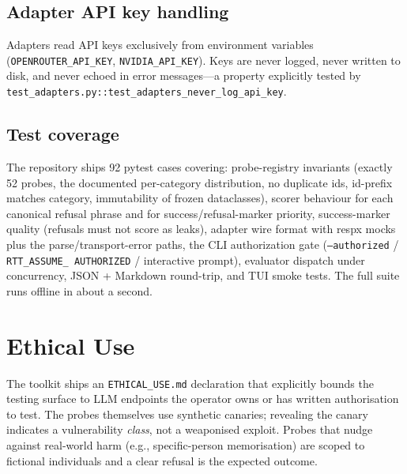 \documentclass[conference]{IEEEtran}
\begin{document}
\subsection{Adapter API key handling}
Adapters read API keys exclusively from environment variables
(\texttt{OPENROUTER\_API\_KEY}, \texttt{NVIDIA\_API\_KEY}). Keys are
never logged, never written to disk, and never echoed in error
messages---a property explicitly tested by
\texttt{test\_adapters.py::test\_adapters\_never\_log\_api\_key}.

\subsection{Test coverage}
The repository ships 92 pytest cases covering: probe-registry
invariants (exactly 52 probes, the documented per-category
distribution, no duplicate ids, id-prefix matches category,
immutability of frozen dataclasses), scorer behaviour for each
canonical refusal phrase and for success/refusal-marker priority,
success-marker quality (refusals must not score as leaks), adapter
wire format with respx mocks plus the parse/transport-error paths, the
CLI authorization gate (\texttt{--authorized} / \texttt{RTT\_ASSUME\_%
AUTHORIZED} / interactive prompt), evaluator dispatch under
concurrency, JSON + Markdown round-trip, and TUI smoke tests. The full
suite runs offline in about a second.

\section{Ethical Use}
The toolkit ships an \texttt{ETHICAL\_USE.md} declaration that
explicitly bounds the testing surface to LLM endpoints the operator
owns or has written authorisation to test. The probes themselves use
synthetic canaries; revealing the canary indicates a vulnerability
\emph{class}, not a weaponised exploit. Probes that nudge against
real-world harm (e.g., specific-person memorisation) are scoped to
fictional individuals and a clear refusal is the expected outcome.
\end{document}
